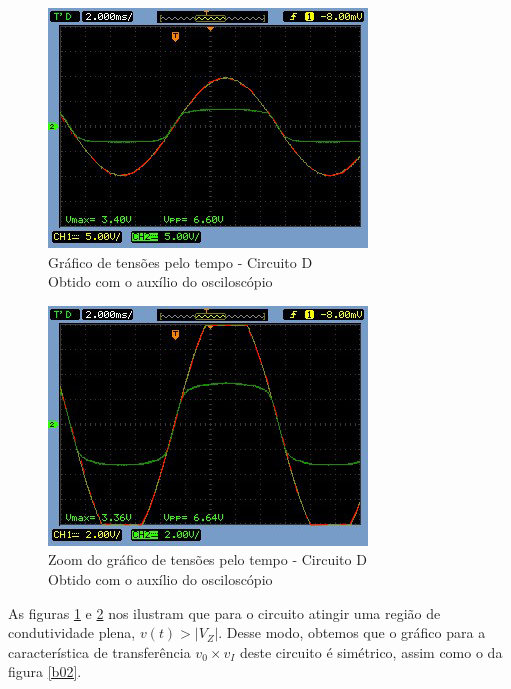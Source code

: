 \documentclass[10pt, final, a4paper]{IEEEtran} %
\begin{document}
\begin{figure}[ht!]
	\captionsetup{justification=centering}
	\centering
	\includegraphics[width=0.8\linewidth]{imagens/circuitos_resp/d01.jpg}
	\caption{Gráfico de tensões pelo tempo - Circuito D\\ Obtido com o auxílio do osciloscópio}
	\label{d01}
\end{figure}
\FloatBarrier

\begin{figure}[ht!]
	\captionsetup{justification=centering}
	\centering
	\includegraphics[width=0.8\linewidth]{imagens/circuitos_resp/d01_z.jpg}
	\caption{Zoom do gráfico de tensões pelo tempo - Circuito D\\ Obtido com o auxílio do osciloscópio}
	\label{d01_z}
\end{figure}
\FloatBarrier

As figuras \ref{d01} e \ref{d01_z} nos ilustram que para o circuito atingir uma região de condutividade plena, $v(t) > |V_Z|$. Desse modo, obtemos que o gráfico para a característica de transferência $v_0 \times v_I$ deste circuito é simétrico, assim como o da figura \ref{b02}.
\end{document}
